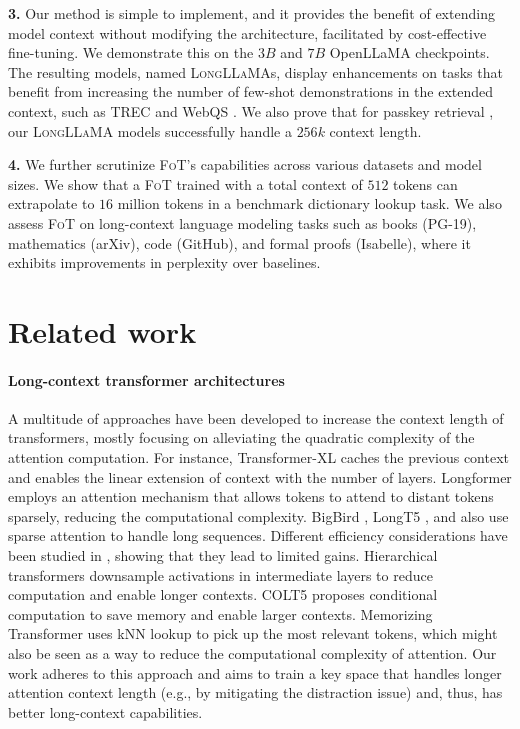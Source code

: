 \textbf{3.} Our method is simple to implement, and it provides the benefit of {extending model context} without modifying {the} architecture, facilitated by cost-effective fine-tuning. We demonstrate this on the $3B$ and $7B$ OpenLLaMA checkpoints. The resulting models, named  \textsc{LongLLaMA}s, display enhancements on tasks that benefit from increasing the number of few-shot demonstrations in the extended context, such as TREC \citep{li-roth-2002-learning, hovy-etal-2001-toward} and WebQS \citep{berant-etal-2013-semantic}. We also prove that for passkey retrieval \cite{mohtashami2023landmark}, our \textsc{LongLLaMA} models successfully handle a $256k$ context length. 

\textbf{4.} We further scrutinize  \textsc{FoT}'s capabilities across various datasets and model sizes. We show that a \textsc{FoT} trained with a total context of $512$ tokens can extrapolate to $16$ million tokens in a benchmark dictionary lookup task. We also assess \textsc{FoT} on long-context language modeling tasks such as books (PG-19), mathematics (arXiv), code (GitHub), and formal proofs (Isabelle), where it exhibits improvements in perplexity over baselines.

\section{Related work} \label{sec:related_work}

 \paragraph{Long-context transformer architectures} A multitude of  approaches have been developed to increase the context length of transformers, mostly focusing on alleviating the quadratic complexity of the attention computation. For instance, Transformer-XL \citep{dai2019transformerxl} caches the previous context and enables the linear extension of context with the number of layers. Longformer \citep{beltagy2020longformer} employs an attention mechanism that allows tokens to attend to distant tokens sparsely, reducing the computational complexity. BigBird \citep{zaheer2020bigbird}, LongT5 \citep{guo2021longt5}, and  \citep{dao2022flash} also use sparse attention to handle long sequences. Different efficiency considerations have been studied in \citep{kaddour2023train}, showing that they lead to limited gains. Hierarchical transformers \citep{nawrot2021hierarchical, nawrot2023efficient} downsample activations in intermediate layers to reduce computation and enable longer contexts. COLT5 \citep{ainslie2023colt5} proposes conditional computation to save memory and enable larger contexts. Memorizing Transformer \citep{wu2022memorizing} uses kNN lookup to pick up the most relevant tokens, which might also be seen as a way to reduce the computational complexity of attention. Our work adheres to this approach and aims to train a key space that handles longer attention context length (e.g., by mitigating the distraction issue) and, thus, has better long-context capabilities.

